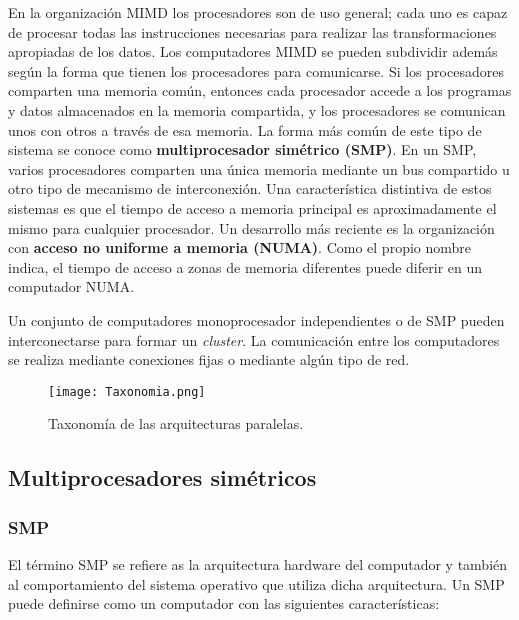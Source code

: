 En la organización MIMD los procesadores son de uso general; cada uno es capaz de procesar todas las instrucciones necesarias para realizar las transformaciones apropiadas de los datos. Los computadores MIMD se pueden subdividir además según la forma que tienen los procesadores para comunicarse. Si los procesadores comparten una memoria común, entonces cada procesador accede a los programas y datos almacenados en la memoria compartida, y los procesadores se comunican unos con otros a través de esa memoria. La forma más común de este tipo de sistema se conoce como \textbf{multiprocesador simétrico (SMP)}. En un SMP, varios procesadores comparten una única memoria mediante un bus compartido u otro tipo de mecanismo de interconexión. Una característica distintiva de estos sistemas es que el tiempo de acceso a memoria principal es aproximadamente el mismo para cualquier procesador. Un desarrollo más reciente es la organización con \textbf{acceso no uniforme a memoria (NUMA)}. Como el propio nombre indica, el tiempo de acceso a zonas de memoria diferentes puede diferir en un computador NUMA.\@

Un conjunto de computadores monoprocesador independientes o de SMP pueden interconectarse para formar un \textit{cluster}. La comunicación entre los computadores se realiza mediante conexiones fijas o mediante algún tipo de red.

\begin{figure}[H]
  \centering
  \texttt{[image: Taxonomia.png]}
  \caption{Taxonomía de las arquitecturas paralelas.}
\end{figure}

\subsection{Multiprocesadores simétricos}

\subsubsection{SMP}

El término SMP se refiere as la arquitectura hardware del computador y también al comportamiento del sistema operativo que utiliza dicha arquitectura. Un SMP puede definirse como un computador con las siguientes características:

